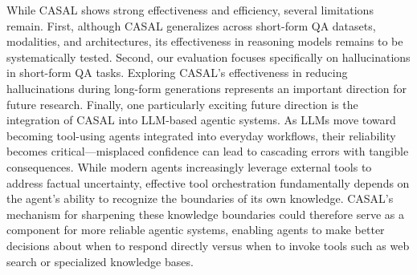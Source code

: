 \documentclass{article} %
\begin{document}
While CASAL shows strong effectiveness and efficiency, several limitations remain. First, although CASAL generalizes across short-form QA datasets, modalities, and architectures, its effectiveness in reasoning models remains to be systematically tested. Second, our evaluation focuses specifically on hallucinations in short-form QA tasks. Exploring CASAL's effectiveness in reducing hallucinations during long-form generations \citep{obeso2025realtimedetectionhallucination} represents an important direction for future research.
Finally, one particularly exciting future direction is the integration of CASAL into LLM-based agentic systems. As LLMs move toward becoming tool-using agents integrated into everyday workflows, their reliability becomes critical—misplaced confidence can lead to cascading errors with tangible consequences. While modern agents increasingly leverage external tools to address factual uncertainty, effective tool orchestration fundamentally depends on the agent's ability to recognize the boundaries of its own knowledge. CASAL's mechanism for sharpening these knowledge boundaries could therefore serve as a component for more reliable agentic systems, enabling agents to make better decisions about when to respond directly versus when to invoke tools such as web search or specialized knowledge bases.





\end{document}
